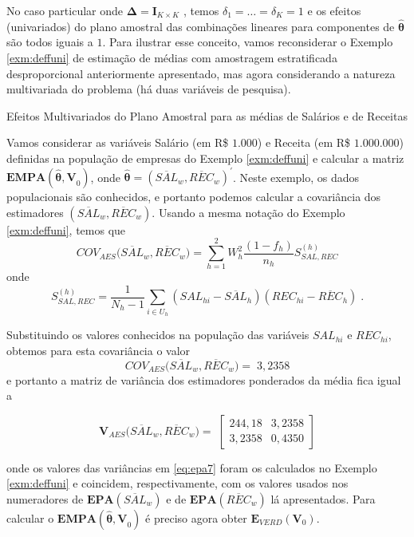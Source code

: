 \documentclass[]{book}
\theoremstyle{definition}
\theoremstyle{definition}
\theoremstyle{definition}
\theoremstyle{remark}
\let\BeginKnitrBlock\begin \let\EndKnitrBlock\end
\begin{document}
No caso particular onde \(\mathbf{\Delta =I}_{K\times K}\) , temos
\(\delta_{1}=\ldots =\delta _{K}=1\) e os efeitos (univariados) do plano
amostral das combinações lineares para componentes de
\(\mathbf{\hat{\theta}}\) são todos iguais a \(1\). Para ilustrar esse
conceito, vamos reconsiderar o Exemplo \ref{exm:deffuni} de estimação de
médias com amostragem estratificada desproporcional anteriormente
apresentado, mas agora considerando a natureza multivariada do problema
(há duas variáveis de pesquisa).

\BeginKnitrBlock{example}
\protect\hypertarget{exm:deffmult}{}{\label{exm:deffmult} }Efeitos
Multivariados do Plano Amostral para as médias de Salários e de Receitas
\EndKnitrBlock{example}

Vamos considerar as variáveis Salário (em R\$ \(1.000\)) e Receita (em
R\$ \(1.000.000\)) definidas na população de empresas do Exemplo
\ref{exm:deffuni} e calcular a matriz
\(\mathbf{EMPA}\left( \mathbf{\hat{\theta},V}_{0}\right)\), onde
\(\mathbf{\hat{\theta}=}\left( \overline{SAL}_{w},\overline{REC}_{w}\right) ^{\prime }\).
Neste exemplo, os dados populacionais são conhecidos, e portanto podemos
calcular a covariância dos estimadores
\(\left( \overline{SAL}_{w},\overline{REC}_{w}\right)\). Usando a mesma
notação do Exemplo \ref{exm:deffuni}, temos que \[
COV_{AES}(\overline{SAL}_{w},\overline{REC}_{w}\mathbf{)=}\sum\limits_{h=1}^{2}W_{h}^{2}\frac{\left( 1-f_{h}\right) }{n_{h}}S_{SAL,REC}^{\left( h\right) } 
\] onde \[
S_{SAL,REC}^{\left( h\right) }=\frac{1}{N_{h}-1}\sum\limits_{i\in
U_{h}}\left( SAL_{hi}-\overline{SAL}_{h}\right) \left( REC_{hi}-\overline{REC
}_{h}\right) \;. 
\]

Substituindo os valores conhecidos na população das variáveis
\(SAL_{hi}\) e \(REC_{hi}\), obtemos para esta covariância o valor \[
COV_{AES}(\overline{SAL}_{w},\overline{REC}_{w}\mathbf{)=\;}3,2358
\] e portanto a matriz de variância dos estimadores ponderados da média
fica igual a

\begin{equation}
\mathbf{V}_{AES}(\overline{SAL}_{w},\overline{REC}_{w}\mathbf{)=\;}
\left[ \begin{array}{rr}
244,18 & 3,2358 \\ 
3,2358 & 0,4350
\end{array}
\right]   \label{eq:epa7}
\end{equation}

onde os valores das variâncias em \eqref{eq:epa7} foram os calculados no
Exemplo \ref{exm:deffuni} e coincidem, respectivamente, com os valores
usados nos numeradores de
\(\mathbf{EPA}\left( \overline{SAL}_{w}\right)\) e de
\(\mathbf{EPA}\left( \overline{REC}_{w}\right)\) lá apresentados. Para
calcular o \(\mathbf{EMPA}(\mathbf{\hat{\theta},V}_{0})\) é preciso
agora obter \(\mathbf{E}_{VERD}\left(\mathbf{V}_{0}\right)\).
\end{document}
